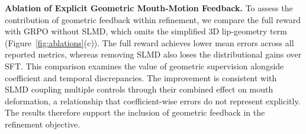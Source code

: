 \noindent\textbf{Ablation of Explicit Geometric Mouth-Motion Feedback.}
To assess the contribution of geometric feedback within refinement, we compare the full reward with GRPO without SLMD, which omits the simplified 3D lip-geometry term (Figure~\ref{fig:ablations}(c)).
The full reward achieves lower mean errors across all reported metrics, whereas removing SLMD also loses the distributional gains over SFT.
This comparison examines the value of geometric supervision alongside coefficient and temporal discrepancies.
The improvement is consistent with SLMD coupling multiple controls through their combined effect on mouth deformation, a relationship that coefficient-wise errors do not represent explicitly.
The results therefore support the inclusion of geometric feedback in the refinement objective.
